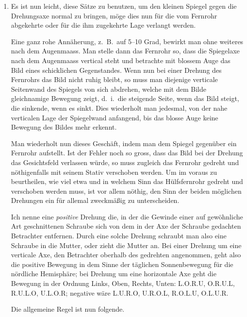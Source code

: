 \documentclass[12pt,a4paper]{article}
\theoremstyle{plain}
\theoremstyle{definition}
\theoremstyle{remark}
\begin{document}
\begin{enumerate}[label=\arabic*.]
\item Es ist nun leicht, diese S\"atze zu benutzen, um den kleinen Spiegel gegen die Drehungsaxe normal zu bringen, m\"oge dies nun f\"ur die vom Fernrohr abgekehrte oder f\"ur die ihm zugekehrte Lage verlangt werden.

Eine ganz rohe Ann\"aherung, z.~B.\ auf 5--10 Grad, bewirkt man ohne weiteres nach dem Augenmaass. Man stelle dann das Fernrohr so, dass die Spiegelaxe nach dem Augenmaass vertical steht und betrachte mit blossem Auge das Bild eines schicklichen Gegenstandes. Wenn nun bei einer Drehung des Fernrohrs das Bild nicht ruhig bleibt, so muss man diejenige verticale Seitenwand des Spiegels von sich abdrehen, welche mit dem Bilde gleichnamige Bewegung zeigt, d.~i.\ die steigende Seite, wenn das Bild steigt, die sinkende, wenn es sinkt. Dies wiederholt man jedesmal, von der nahe verticalen Lage der Spiegelwand anfangend, bis das blosse Auge keine Bewegung des Bildes mehr erkennt.

Man wiederholt nun dieses Gesch\"aft, indem man dem Spiegel gegen\"uber ein Fernrohr aufstellt. Ist der Fehler noch so gross, dass das Bild bei der Drehung das Gesichtsfeld verlassen w\"urde, so muss zugleich das Fernrohr gedreht und n\"othigenfalls mit seinem Stativ verschoben werden. Um im voraus zu beurtheilen, wie viel etwa und in welchem Sinn das H\"ulfsfernrohr gedreht und verschoben werden muss, ist vor allem n\"othig, den Sinn der beiden m\"oglichen Drehungen ein f\"ur allemal zweckm\"a\ss ig zu unterscheiden.

Ich nenne eine \emph{positive} Drehung die, in der die Gewinde einer auf gew\"ohnliche Art geschnittenen Schraube sich von dem in der Axe der Schraube gedachten Betrachter entfernen. Durch eine solche Drehung schraubt man also eine Schraube in die Mutter, oder zieht die Mutter an. Bei einer Drehung um eine verticale Axe, den Betrachter oberhalb des gedrehten angenommen, geht also die positive Bewegung in dem Sinne der t\"aglichen Sonnenbewegung f\"ur die n\"ordliche Hemisph\"are; bei Drehung um eine horizontale Axe geht die Bewegung in der Ordnung Links, Oben, Rechts, Unten: L.O.R.U, O.R.U.L, R.U.L.O, U.L.O.R; negative w\"are L.U.R.O, U.R.O.L, R.O.L.U, O.L.U.R.

Die allgemeine Regel ist nun folgende.


\end{enumerate}
\end{document}
